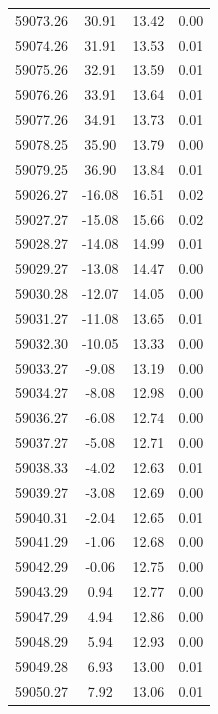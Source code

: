 \begin{longtable}{|c|c|c|c|}
 59073.26 &   30.91 &       13.42 &          0.00 \\
 59074.26 &   31.91 &       13.53 &          0.01 \\
 59075.26 &   32.91 &       13.59 &          0.01 \\
 59076.26 &   33.91 &       13.64 &          0.01 \\
 59077.26 &   34.91 &       13.73 &          0.01 \\
 59078.25 &   35.90 &       13.79 &          0.00 \\
 59079.25 &   36.90 &       13.84 &          0.01 \\
 59026.27 &  -16.08 &       16.51 &          0.02 \\
 59027.27 &  -15.08 &       15.66 &          0.02 \\
 59028.27 &  -14.08 &       14.99 &          0.01 \\
 59029.27 &  -13.08 &       14.47 &          0.00 \\
 59030.28 &  -12.07 &       14.05 &          0.00 \\
 59031.27 &  -11.08 &       13.65 &          0.01 \\
 59032.30 &  -10.05 &       13.33 &          0.00 \\
 59033.27 &   -9.08 &       13.19 &          0.00 \\
 59034.27 &   -8.08 &       12.98 &          0.00 \\
 59036.27 &   -6.08 &       12.74 &          0.00 \\
 59037.27 &   -5.08 &       12.71 &          0.00 \\
 59038.33 &   -4.02 &       12.63 &          0.01 \\
 59039.27 &   -3.08 &       12.69 &          0.00 \\
 59040.31 &   -2.04 &       12.65 &          0.01 \\
 59041.29 &   -1.06 &       12.68 &          0.00 \\
 59042.29 &   -0.06 &       12.75 &          0.00 \\
 59043.29 &    0.94 &       12.77 &          0.00 \\
 59047.29 &    4.94 &       12.86 &          0.00 \\
 59048.29 &    5.94 &       12.93 &          0.00 \\
 59049.28 &    6.93 &       13.00 &          0.01 \\
 59050.27 &    7.92 &       13.06 &          0.01 \\

\end{longtable}
